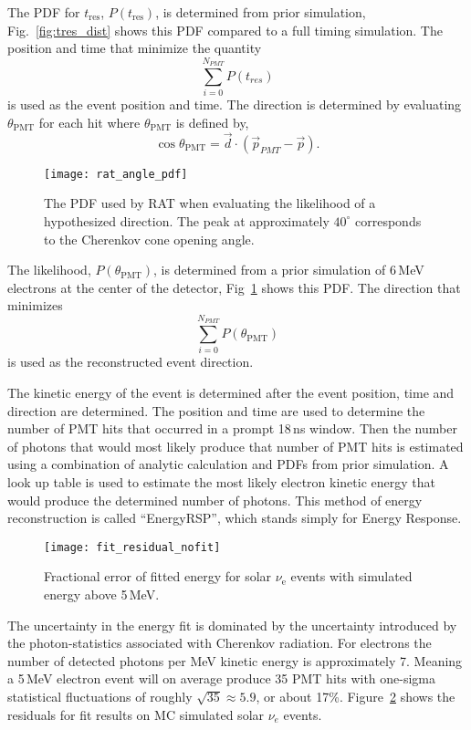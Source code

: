 The PDF for $t_{\mathrm{res}}$, $P(t_{\mathrm{res}})$, is determined from prior simulation,
Fig.~\ref{fig:tres_dist} shows this PDF compared to a full timing simulation.
The position and time that minimize the quantity
\begin{equation}
\sum_{i=0}^{N_{PMT}} P(t_{res}) %
\end{equation}
is used as the event position and time.
The direction is determined by evaluating $\theta_{\mathrm{PMT}}$ for each hit where
$\theta_{\mathrm{PMT}}$ is defined by,
\begin{equation}
    \cos\theta_{\mathrm{PMT}} = \vec{d}\cdot\left(\vec{p}_{PMT} - \vec{p}\right)\text{.}
\end{equation}
\begin{figure}[htbp]
\centering
\texttt{[image: rat\_angle\_pdf]}
\caption[RAT PDF for Direction Fit]{The PDF used by RAT when evaluating the
likelihood of a hypothesized direction.  The peak at approximately $40^{\circ}$
corresponds to the Cherenkov cone opening angle.}
\label{fig:rat_angle_pdf}
\end{figure}

The likelihood, $P(\theta_{\mathrm{PMT}})$, is determined from a prior simulation of
6\,MeV electrons at the center of the detector, Fig~\ref{fig:rat_angle_pdf} shows
this PDF\@.
The direction that minimizes
\begin{equation}
\sum_{i=0}^{N_{PMT}} P(\theta_{\mathrm{PMT}})
\end{equation}
is used as the reconstructed event direction.

The kinetic energy of the event is determined after
the event position, time and direction are determined.
The position and time are used to determine the number of PMT
hits that occurred in a prompt 18\,ns window.
Then the number of photons that would most likely produce
that number of PMT hits is estimated using a combination of
analytic calculation and PDFs from prior simulation.
A look up table is used to estimate the most likely electron
kinetic energy that would produce the determined number of photons.
This method of energy reconstruction is called ``EnergyRSP'', which stands
simply for Energy Response.

\begin{figure}[htbp]
\centering
\texttt{[image: fit\_residual\_nofit]}
\caption[EnergyRSP Fit Residuals]{Fractional error of fitted energy   for solar $\nu_{\mathrm{e}}$ events
with simulated energy above 5\,MeV.
}
\label{fig:mc_fit_residuals}
\end{figure}
The uncertainty in the energy fit is dominated by the uncertainty
introduced by the photon-statistics associated with Cherenkov radiation.
For electrons the number of detected photons per MeV kinetic energy is approximately 7.
Meaning a 5\,MeV electron event will on average produce 35 PMT hits with
one-sigma statistical fluctuations of roughly $\sqrt{35} \approx 5.9$, or about 17\%.
Figure~\ref{fig:mc_fit_residuals} shows the residuals for fit results on MC simulated solar $\nu_{e}$ events.

